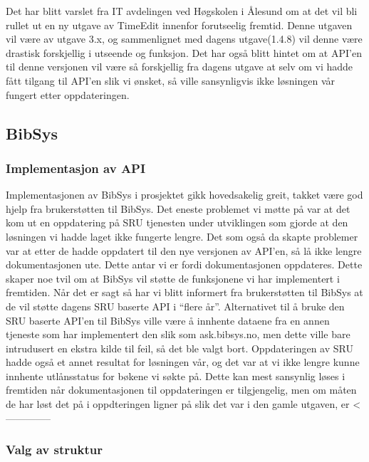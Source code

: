 \documentclass[../main.tex]{subfiles}
\begin{document}
Det har blitt varslet fra IT avdelingen ved Høgskolen i Ålesund om at det vil bli rullet ut en ny utgave av TimeEdit innenfor forutseelig fremtid. Denne utgaven vil være av utgave 3.x, og sammenlignet med dagens utgave(1.4.8) vil denne være drastisk forskjellig i utseende og funksjon. Det har også blitt hintet om at API’en til denne versjonen vil være så forskjellig fra dagens utgave at selv om vi hadde fått tilgang til API’en slik vi ønsket, så ville sansynligvis ikke løsningen vår fungert etter oppdateringen.

\subsection{BibSys}

\subsubsection{Implementasjon av API}

Implementasjonen av BibSys i prosjektet gikk hovedsakelig greit, takket være god hjelp fra brukerstøtten til BibSys. Det eneste problemet vi møtte på var at det kom ut en oppdatering på SRU tjenesten under utviklingen som gjorde at den løsningen vi hadde laget ikke fungerte lengre. Det som også da skapte problemer var at etter de hadde oppdatert til den nye versjonen av API’en, så lå ikke lengre dokumentasjonen ute. Dette antar vi er fordi dokumentasjonen oppdateres. Dette skaper noe tvil om at BibSys vil støtte de funksjonene vi har implementert i fremtiden. Når det er sagt så har vi blitt informert fra brukerstøtten til BibSys at de vil støtte dagens SRU baserte API i “flere år”.
Alternativet til å bruke den SRU baserte API’en til BibSys ville være å innhente dataene fra en annen tjeneste som har implementert den slik som ask.bibsys.no, men dette ville bare intrudusert en ekstra kilde til feil, så det ble valgt bort.\newline 
Oppdateringen av SRU hadde også et annet resultat for løsningen vår, og det var at vi ikke lengre kunne innhente utlånsstatus for bøkene vi søkte på. Dette kan mest sansynlig løses i fremtiden når dokumentasjonen til oppdateringen er tilgjengelig, men om måten de har løst det på i oppdteringen ligner på slik det var i den gamle utgaven, er <--------------

\subsubsection{Valg av struktur}
\end{document}
